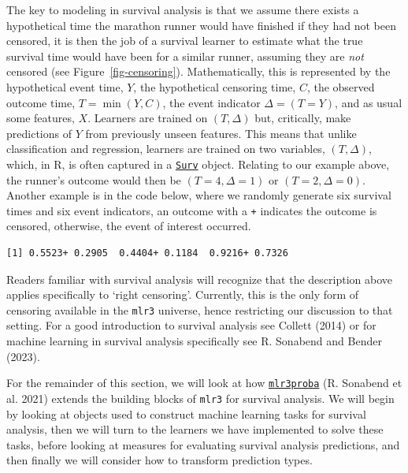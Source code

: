 The key to modeling in survival analysis is that we assume there exists
a hypothetical time the marathon runner would have finished if they had
not been censored, it is then the job of a survival learner to estimate
what the true survival time would have been for a similar runner,
assuming they are \emph{not} censored (see Figure~\ref{fig-censoring}).
Mathematically, this is represented by the hypothetical event time,
\(Y\), the hypothetical censoring time, \(C\), the observed outcome
time, \(T = \min(Y, C)\), the event indicator \(\Delta = (T = Y)\), and
as usual some features, \(X\). Learners are trained on \((T, \Delta)\)
but, critically, make predictions of \(Y\) from previously unseen
features. This means that unlike classification and regression, learners
are trained on two variables, \((T, \Delta)\), which, in R, is often
captured in a
\href{https://www.rdocumentation.org/packages/survival/topics/Surv}{\texttt{Surv}}
object. Relating to our example above, the runner's outcome would then
be \((T = 4, \Delta = 1)\) or \((T = 2, \Delta = 0)\). Another example
is in the code below, where we randomly generate six survival times and
six event indicators, an outcome with a \texttt{+} indicates the outcome
is censored, otherwise, the event of interest occurred.

\begin{Shaded}
\begin{Highlighting}[]
\NormalTok{(}\NormalTok{(}\NormalTok{), }\NormalTok{(}\NormalTok{, }\NormalTok{, }\NormalTok{))}
\end{Highlighting}
\end{Shaded}

\begin{verbatim}
[1] 0.5523+ 0.2905  0.4404+ 0.1184  0.9216+ 0.7326 
\end{verbatim}

Readers familiar with survival analysis will recognize that the
description above applies specifically to `right censoring'. Currently,
this is the only form of censoring available in the \texttt{mlr3}
universe, hence restricting our discussion to that setting. For a good
introduction to survival analysis see Collett (2014) or for machine
learning in survival analysis specifically see R. Sonabend and Bender
(2023).

For the remainder of this section, we will look at how
\href{https://mlr3proba.mlr-org.com}{\texttt{mlr3proba}}
(R. Sonabend et al. 2021) extends the building blocks of \texttt{mlr3}
for survival analysis. We will begin by looking at objects used to
construct machine learning tasks for survival analysis, then we will
turn to the learners we have implemented to solve these tasks, before
looking at measures for evaluating survival analysis predictions, and
then finally we will consider how to transform prediction types.

